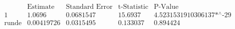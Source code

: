 \[\begin{array}{l|llll}
 \text{} & \text{Estimate} & \text{Standard Error} & \text{t-Statistic} & \text{P-Value} \\
\hline
 1 & 1.0696 & 0.0681547 & 15.6937 & \text{4.5231531910306137$\grave{ }$*${}^{\wedge}$-29} \\
 \text{runde} & 0.00419726 & 0.0315495 & 0.133037 & 0.894424 \\
\end{array}\]


